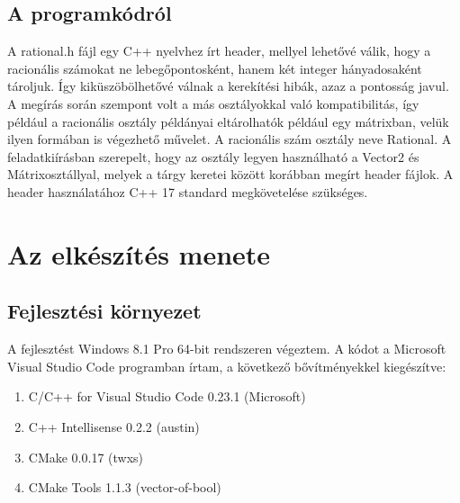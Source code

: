 \documentclass[a4paper, 12pt]{article}
\begin{document}
\subsection*{A programkódról}
A rational.h fájl egy C++ nyelvhez írt header, mellyel lehetővé válik, hogy a racionális számokat ne lebegőpontosként,
hanem két integer hányadosaként tároljuk. Így kiküszöbölhetővé válnak a kerekítési hibák, azaz a pontosság javul.
A megírás során szempont volt a más osztályokkal való kompatibilitás, így például a racionális osztály példányai eltárolhatók például
egy mátrixban, velük ilyen formában is végezhető művelet. A racionális szám osztály neve Rational.
A feladatkiírásban szerepelt, hogy az osztály legyen használható a Vector2 és Mátrixosztállyal, melyek a tárgy keretei között korábban megírt header fájlok.
A header használatához C++ 17 standard megkövetelése szükséges.

\section{Az elkészítés menete}
\subsection*{Fejlesztési környezet}
A fejlesztést Windows 8.1 Pro 64-bit rendszeren végeztem. A kódot a Microsoft Visual Studio Code programban írtam, a következő bővítményekkel kiegészítve:
\begin{enumerate}
  \item C/C++ for Visual Studio Code 0.23.1 (Microsoft)
  \item C++ Intellisense 0.2.2 (austin)
  \item CMake 0.0.17 (twxs)
  \item CMake Tools 1.1.3 (vector-of-bool)
\end{enumerate}
\end{document}
